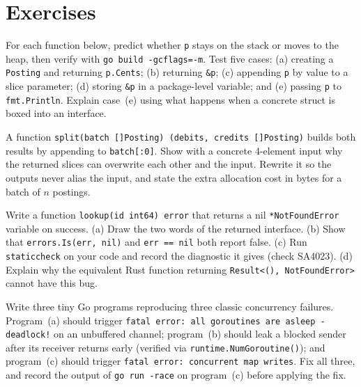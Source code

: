 \section{Exercises}
\label{ch11:exercises}

\begin{exercise}
\label{ex:ch11-escape}
For each function below, predict whether \texttt{p} stays on the stack or moves to the heap, then verify with \texttt{go build -gcflags=-m}. Test five cases: (a) creating a \texttt{Posting} and returning \texttt{p.Cents}; (b) returning \texttt{\&p}; (c) appending \texttt{p} by value to a slice parameter; (d) storing \texttt{\&p} in a package-level variable; and (e) passing \texttt{p} to \texttt{fmt.Println}. Explain case~(e) using what happens when a concrete struct is boxed into an interface.
\end{exercise}

\begin{exercise}
\label{ex:ch11-slices}
A function \texttt{split(batch []Posting) (debits, credits []Posting)} builds both results by appending to \texttt{batch[:0]}. Show with a concrete 4-element input why the returned slices can overwrite each other and the input. Rewrite it so the outputs never alias the input, and state the extra allocation cost in bytes for a batch of $n$ postings.
\end{exercise}

\begin{exercise}
\label{ex:ch11-typed-nil}
Write a function \texttt{lookup(id int64) error} that returns a nil \texttt{*NotFoundError} variable on success. (a) Draw the two words of the returned interface. (b) Show that \texttt{errors.Is(err, nil)} and \texttt{err == nil} both report false. (c) Run \texttt{staticcheck} on your code and record the diagnostic it gives (check SA4023). (d) Explain why the equivalent Rust function returning \texttt{Result<(), NotFoundError>} cannot have this bug.
\end{exercise}

\begin{exercise}
\label{ex:ch11-concurrency-bugs}
Write three tiny Go programs reproducing three classic concurrency failures. Program~(a) should trigger \texttt{fatal error: all goroutines are asleep - deadlock!} on an unbuffered channel; program~(b) should leak a blocked sender after its receiver returns early (verified via \texttt{runtime.NumGoroutine()}); and program~(c) should trigger \texttt{fatal error: concurrent map writes}. Fix all three, and record the output of \texttt{go run -race} on program~(c) before applying the fix.
\end{exercise}

